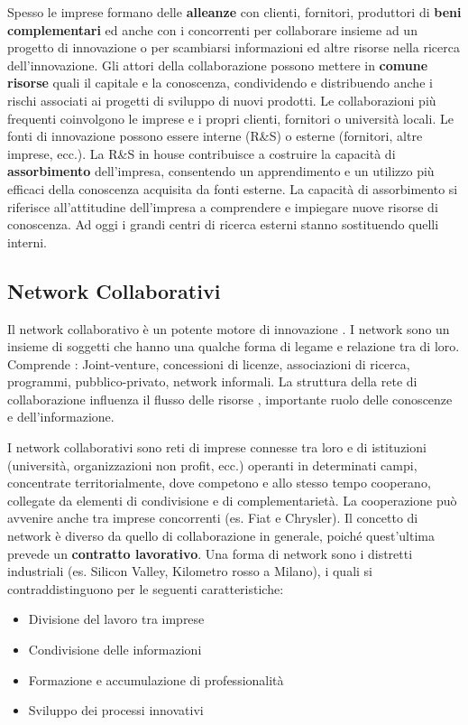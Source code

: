 \documentclass{article}
\begin{document}
Spesso le imprese formano delle \textbf{alleanze} con clienti, fornitori, produttori di \textbf{beni complementari}
ed anche con i concorrenti per collaborare insieme ad un progetto di innovazione o per scambiarsi
informazioni ed altre risorse nella ricerca dell’innovazione.
Gli attori della collaborazione possono mettere in \textbf{comune risorse} quali il capitale e la conoscenza,
condividendo e distribuendo anche i rischi associati ai progetti di sviluppo di nuovi prodotti.
Le collaborazioni più frequenti coinvolgono le imprese e i propri clienti, fornitori o università locali.
Le fonti di innovazione possono essere interne (R\&S) o esterne (fornitori, altre imprese, ecc.).
La R\&S in house contribuisce a costruire la capacità di \textbf{assorbimento} dell’impresa, consentendo un
apprendimento e un utilizzo più efficaci della conoscenza acquisita da fonti esterne. La capacità di
assorbimento si riferisce all’attitudine dell’impresa a comprendere e impiegare nuove risorse di
conoscenza.
Ad oggi i grandi centri di ricerca esterni stanno sostituendo quelli interni.

\subsection{Network Collaborativi}
Il network collaborativo è un potente motore di innovazione . I network sono un
insieme di soggetti che hanno una qualche forma di legame e relazione tra di loro.
Comprende : Joint-venture, concessioni  di licenze, associazioni di ricerca, programmi, pubblico-privato, network informali.
La struttura della rete di collaborazione influenza  il flusso delle risorse , importante ruolo delle conoscenze e dell’informazione. 

I network collaborativi sono reti di imprese connesse tra loro e di istituzioni (università,
organizzazioni non profit, ecc.) operanti in determinati campi, concentrate territorialmente, dove
competono e allo stesso tempo cooperano, collegate da elementi di condivisione e di
complementarietà. La cooperazione può avvenire anche tra imprese concorrenti (es. Fiat e
Chrysler). Il concetto di network è diverso da quello di collaborazione in generale, poiché
quest’ultima prevede un \textbf{contratto lavorativo}.
Una forma di network sono i distretti industriali (es. Silicon Valley, Kilometro rosso a Milano), i
quali si contraddistinguono per le seguenti caratteristiche:

\begin{itemize}
	\item Divisione del lavoro tra imprese
	\item Condivisione delle informazioni
	\item Formazione e accumulazione di professionalità
	\item Sviluppo dei processi innovativi
\end{itemize}
\end{document}
